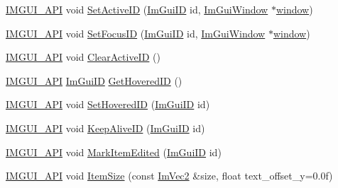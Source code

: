 \begin{DoxyCompactItemize}
\mbox{\hyperlink{imgui_8h_a43829975e84e45d1149597467a14bbf5}{I\+M\+G\+U\+I\+\_\+\+A\+PI}} void \mbox{\hyperlink{namespace_im_gui_a27b8ace13a8c421ee8405f0cbebe4ead}{Set\+Active\+ID}} (\mbox{\hyperlink{imgui_8h_a1785c9b6f4e16406764a85f32582236f}{Im\+Gui\+ID}} id, \mbox{\hyperlink{struct_im_gui_window}{Im\+Gui\+Window}} $\ast$\mbox{\hyperlink{radar_8cpp_a80de27bd7dc4e2b2ad3d5895b97a70f0}{window}})
\item 
\mbox{\hyperlink{imgui_8h_a43829975e84e45d1149597467a14bbf5}{I\+M\+G\+U\+I\+\_\+\+A\+PI}} void \mbox{\hyperlink{namespace_im_gui_a8ad578d7141486ff12b59b0c251234e6}{Set\+Focus\+ID}} (\mbox{\hyperlink{imgui_8h_a1785c9b6f4e16406764a85f32582236f}{Im\+Gui\+ID}} id, \mbox{\hyperlink{struct_im_gui_window}{Im\+Gui\+Window}} $\ast$\mbox{\hyperlink{radar_8cpp_a80de27bd7dc4e2b2ad3d5895b97a70f0}{window}})
\item 
\mbox{\hyperlink{imgui_8h_a43829975e84e45d1149597467a14bbf5}{I\+M\+G\+U\+I\+\_\+\+A\+PI}} void \mbox{\hyperlink{namespace_im_gui_a17ff60ad1e2669130ac38a04d16eb354}{Clear\+Active\+ID}} ()
\item 
\mbox{\hyperlink{imgui_8h_a43829975e84e45d1149597467a14bbf5}{I\+M\+G\+U\+I\+\_\+\+A\+PI}} \mbox{\hyperlink{imgui_8h_a1785c9b6f4e16406764a85f32582236f}{Im\+Gui\+ID}} \mbox{\hyperlink{namespace_im_gui_ad57aba42e0eb99a7302a614ddbc363c9}{Get\+Hovered\+ID}} ()
\item 
\mbox{\hyperlink{imgui_8h_a43829975e84e45d1149597467a14bbf5}{I\+M\+G\+U\+I\+\_\+\+A\+PI}} void \mbox{\hyperlink{namespace_im_gui_aba1f0c75d6f98702e6b02eb1bc30d915}{Set\+Hovered\+ID}} (\mbox{\hyperlink{imgui_8h_a1785c9b6f4e16406764a85f32582236f}{Im\+Gui\+ID}} id)
\item 
\mbox{\hyperlink{imgui_8h_a43829975e84e45d1149597467a14bbf5}{I\+M\+G\+U\+I\+\_\+\+A\+PI}} void \mbox{\hyperlink{namespace_im_gui_a85a245c78a9f7c351636bdad6e60c488}{Keep\+Alive\+ID}} (\mbox{\hyperlink{imgui_8h_a1785c9b6f4e16406764a85f32582236f}{Im\+Gui\+ID}} id)
\item 
\mbox{\hyperlink{imgui_8h_a43829975e84e45d1149597467a14bbf5}{I\+M\+G\+U\+I\+\_\+\+A\+PI}} void \mbox{\hyperlink{namespace_im_gui_a83036681a36fbee2d35b5b57a1ef72e6}{Mark\+Item\+Edited}} (\mbox{\hyperlink{imgui_8h_a1785c9b6f4e16406764a85f32582236f}{Im\+Gui\+ID}} id)
\item 
\mbox{\hyperlink{imgui_8h_a43829975e84e45d1149597467a14bbf5}{I\+M\+G\+U\+I\+\_\+\+A\+PI}} void \mbox{\hyperlink{namespace_im_gui_ac7b9a7399d9606b25278002303f545b6}{Item\+Size}} (const \mbox{\hyperlink{struct_im_vec2}{Im\+Vec2}} \&size, float text\+\_\+offset\+\_\+y=0.\+0f)

\end{DoxyCompactItemize}
